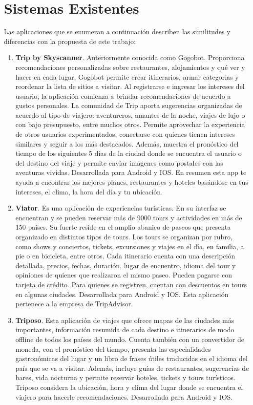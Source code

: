 \section{Sistemas Existentes}

Las aplicaciones que se enumeran a continuación describen las similitudes y diferencias con la propuesta de este trabajo:
\begin{enumerate}
	\item \textbf{Trip by Skyscanner}. Anteriormente conocida como Gogobot. Proporciona recomendaciones personalizadas sobre restaurantes, alojamientos y qué ver y hacer en cada lugar. Gogobot permite crear itinerarios, armar categorías y reordenar la lista de sitios a visitar. Al registrarse e ingresar los intereses del usuario, la aplicación comienza a brindar recomendaciones de acuerdo a gustos personales. La comunidad de Trip aporta sugerencias organizadas de acuerdo al tipo de viajero: aventureros, amantes de la noche, viajes de lujo o con bajo presupuesto, entre muchos otros. Permite aprovechar la experiencia de otros usuarios experimentados, conectarse con quienes tienen intereses similares y seguir a los más destacados. Además, muestra el pronóstico del tiempo de los siguientes 5 días de la ciudad donde se encuentra el usuario o del destino del viaje y permite enviar imágenes como postales con las aventuras vividas. Desarrollada para Android y IOS. En resumen esta app te ayuda a encontrar los mejores planes, restaurantes y hoteles basándose en tus intereses, el clima, la hora del día y tu ubicación.
	
	\item \textbf{Viator}. Es una aplicación de experiencias turísticas. En su interfaz se encuentran y se pueden reservar más de 9000 tours y actividades en más de 150 países. Su fuerte reside en el amplio abanico de paseos que presenta organizado en distintos tipos de tours. Los tours se organizan por rubro, como shows y conciertos, tickets, excursiones y viajes en el día, en familia, a pie o en bicicleta, entre otros. Cada itinerario cuenta con una descripción detallada, precios, fechas, duración, lugar de encuentro, idioma del tour y opiniones de quienes que realizaron el mismo paseo. Pueden pagarse con tarjeta de crédito. Para quienes se registren, cuentan con descuentos en tours en algunas ciudades. Desarrollada para Android y IOS. Esta aplicación pertenece a la empresa de TripAdvisor.
	
	\item \textbf{Triposo}. Esta aplicación de viajes que ofrece mapas de las ciudades más importantes, información resumida de cada destino e itinerarios de modo offline de todos los países del mundo. Cuenta también con un convertidor de moneda, con el pronóstico del tiempo, presenta las especialidades gastronómicas del lugar y un libro de frases útiles traducidas en el idioma del país que se va a visitar. Además, incluye guías de restaurantes, sugerencias de bares, vida nocturna y permite reservar hoteles, tickets y tours turísticos. Triposo considera la ubicación, hora y clima del lugar donde se encuentra el viajero para hacerle recomendaciones. Desarrollada para Android y IOS.
	

\end{enumerate}
